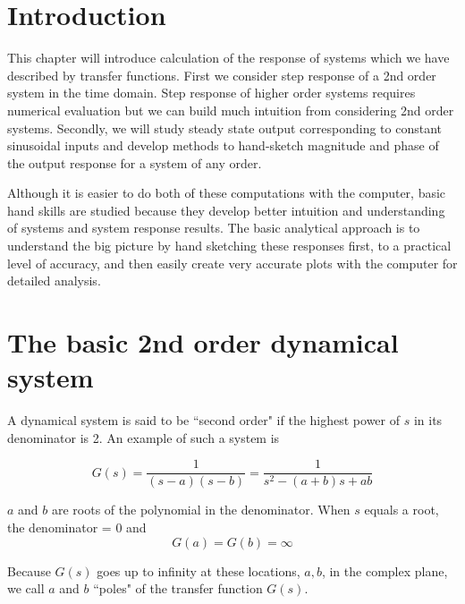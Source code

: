 \section{Introduction}
This chapter will introduce calculation of the response of systems which we have described
by transfer functions.   First we consider step response of a 2nd order system in the time
domain.   Step response of higher order systems requires numerical evaluation but we can
build much intuition from considering 2nd order systems.   Secondly,  we will study steady
state output corresponding to constant sinusoidal inputs and develop methods to
hand-sketch magnitude and phase of the output response for a system of any order.

Although it is easier to do both of these computations with the computer, basic hand skills
are studied because they develop better intuition and understanding of systems and system response
results.  The basic analytical approach is to understand the big picture by hand sketching
these responses first, to a practical level of accuracy, and then easily
create very accurate plots with the computer for detailed analysis.

\section{The basic 2nd order dynamical system}

A dynamical system is said to be ``second order" if the highest power of $s$ in its denominator  is 2.  An example of such a system is

\[
G(s) = \frac1{(s-a)(s-b)} = \frac {1}{s^2 -(a+b)s+ab}
\]


$a$ and $b$ are roots of the polynomial in the denominator.  When $s$ equals a root, the denominator = 0 and
\[
G(a) = G(b) = \infty
\]

Because $G(s)$ goes up to infinity at these locations, $a,b$,  in the complex plane, we call $a$ and $b$ ``poles" of the transfer function
$G(s)$.

\newpage

